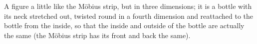 A figure a little like the M\"obius strip, but in three dimensions; it
is a bottle with its neck stretched out, twisted round in a fourth
dimension and reattached to the bottle from the inside, so that the
inside and outside of the bottle are actually the same (the M\"obius
strip has its front and back the same).